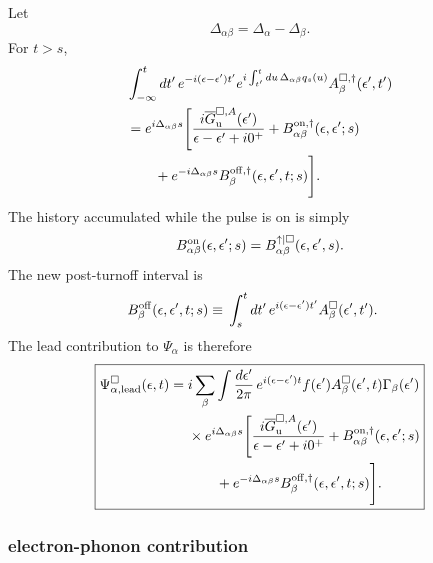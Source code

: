 \documentclass[
 reprint,
 superscriptaddress,
 amsmath,amssymb,
 aps,prb,
 longbibliography,
 floatfix
]{revtex4-2}
\begin{document}
Let
\begin{equation*}
\Delta_{\alpha\beta}
=
\Delta_\alpha-\Delta_\beta.
\end{equation*}
For $t>s$,
\begin{align*}
&\int_{-\infty}^{t}dt'\,
e^{-i(\epsilon-\epsilon')t'}
e^{i\int_{t'}^tdu\,
\Delta_{\alpha\beta}q_s(u)}
A_\beta^{\square,\dagger}
(\epsilon',t')
\\
&=
e^{i\Delta_{\alpha\beta}s}
\Bigg[
\frac{
i\overline G_{\mathrm u}^{\square,A}(\epsilon')
}
{\epsilon-\epsilon'+i0^+}
+
B_{\alpha\beta}^{\rm on,\dagger}
(\epsilon,\epsilon';s)
\\
&\qquad+
e^{-i\Delta_{\alpha\beta}s}
B_\beta^{\rm off,\dagger}
(\epsilon,\epsilon',t;s)
\Bigg].
\end{align*}
The history accumulated while the pulse is on is simply
\begin{equation*}
B_{\alpha\beta}^{\rm on}
(\epsilon,\epsilon';s)
=
B_{\alpha\beta}^{\uparrow|\square}
(\epsilon,\epsilon',s).
\end{equation*}
The new post-turnoff interval is
\begin{equation*}
\begin{aligned}
B_\beta^{\rm off}
(\epsilon,\epsilon',t;s)
\equiv{}&
\int_s^t dt'\,
e^{i(\epsilon-\epsilon')t'}
A_\beta^\square(\epsilon',t').
\end{aligned}
\end{equation*}
The lead contribution to $\Psi_\alpha$ is therefore
\begin{equation}
\boxed{
\begin{aligned}
\Psi_{\alpha,\rm lead}^\square
(\epsilon,t)
={}&
i\sum_\beta
\int\frac{d\epsilon'}{2\pi}\,
e^{i(\epsilon-\epsilon')t}
f(\epsilon')
A_\beta^\square(\epsilon',t)
\Gamma_\beta(\epsilon')
\\
&\times
e^{i\Delta_{\alpha\beta}s}
\Bigg[
\frac{
i\overline G_{\mathrm u}^{\square,A}(\epsilon')
}
{\epsilon-\epsilon'+i0^+}
+
B_{\alpha\beta}^{\rm on,\dagger}
(\epsilon,\epsilon';s)
\\
&\qquad+
e^{-i\Delta_{\alpha\beta}s}
B_\beta^{\rm off,\dagger}
(\epsilon,\epsilon',t;s)
\Bigg].
\end{aligned}}
\label{eq:Psi-square-lead-proof}
\end{equation}

\subsubsection{electron-phonon contribution}
\end{document}

